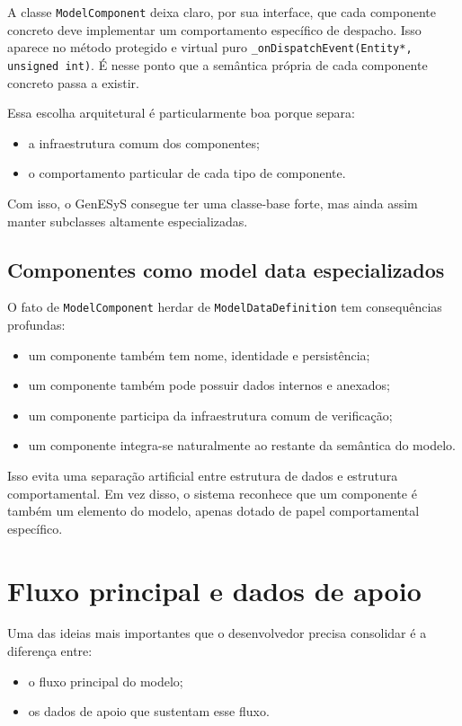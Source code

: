 A classe \texttt{ModelComponent} deixa claro, por sua interface, que cada componente concreto deve implementar um comportamento específico de despacho. Isso aparece no método protegido e virtual puro \texttt{\_onDispatchEvent(Entity*, unsigned int)}. É nesse ponto que a semântica própria de cada componente concreto passa a existir.

Essa escolha arquitetural é particularmente boa porque separa:
\begin{itemize}
    \item a infraestrutura comum dos componentes;
    \item o comportamento particular de cada tipo de componente.
\end{itemize}

Com isso, o GenESyS consegue ter uma classe-base forte, mas ainda assim manter subclasses altamente especializadas.

\subsection{Componentes como model data especializados}
\label{subsec:cap8_componentes_modeldata_especializados}

O fato de \texttt{ModelComponent} herdar de \texttt{ModelDataDefinition} tem consequências profundas:
\begin{itemize}
    \item um componente também tem nome, identidade e persistência;
    \item um componente também pode possuir dados internos e anexados;
    \item um componente participa da infraestrutura comum de verificação;
    \item um componente integra-se naturalmente ao restante da semântica do modelo.
\end{itemize}

Isso evita uma separação artificial entre estrutura de dados e estrutura comportamental. Em vez disso, o sistema reconhece que um componente é também um elemento do modelo, apenas dotado de papel comportamental específico.

\section{Fluxo principal e dados de apoio}
\label{sec:cap8_fluxo_principal_dados_apoio}

Uma das ideias mais importantes que o desenvolvedor precisa consolidar é a diferença entre:
\begin{itemize}
    \item o fluxo principal do modelo;
    \item os dados de apoio que sustentam esse fluxo.
\end{itemize}

